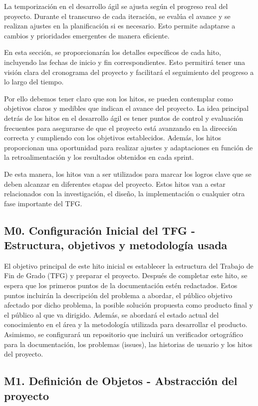 La temporización en el desarrollo ágil se ajusta según el progreso real del proyecto. Durante el transcurso de cada iteración, se evalúa el avance y se realizan ajustes en la planificación si es necesario. Esto permite adaptarse a cambios y prioridades emergentes de manera eficiente.

En esta sección, se proporcionarán los detalles específicos de cada hito, incluyendo las fechas de inicio y fin correspondientes. Esto permitirá tener una visión clara del cronograma del proyecto y facilitará el seguimiento del progreso a lo largo del tiempo.

Por ello debemos tener claro que son los hitos, se pueden contemplar como objetivos claros y medibles que indican el avance del proyecto. La idea principal detrás de los hitos en el desarrollo ágil es tener puntos de control y evaluación frecuentes para asegurarse de que el proyecto está avanzando en la dirección correcta y cumpliendo con los objetivos establecidos. Además, los hitos proporcionan una oportunidad para realizar ajustes y adaptaciones en función de la retroalimentación y los resultados obtenidos en cada sprint. 

De esta manera, los hitos van a ser utilizados para marcar los logros clave que se deben alcanzar en diferentes etapas del proyecto. Estos hitos van a estar relacionados con la investigación, el diseño, la implementación o cualquier otra fase importante del TFG.

\subsection{M0. Configuración Inicial del TFG - Estructura, objetivos y metodología usada}

El objetivo principal de este hito inicial es establecer la estructura del Trabajo de Fin de Grado (TFG) y preparar el proyecto. Después de completar este hito, se espera que los primeros puntos de la documentación estén redactados. Estos puntos incluirán la descripción del problema a abordar, el público objetivo afectado por dicho problema, la posible solución propuesta como producto final y el público al que va dirigido. Además, se abordará el estado actual del conocimiento en el área y la metodología utilizada para desarrollar el producto. Asimismo, se configurará un repositorio que incluirá un verificador ortográfico para la documentación, los problemas (issues), las historias de usuario y los hitos del proyecto.

\subsection{M1. Definición de Objetos - Abstracción del proyecto}

